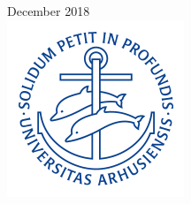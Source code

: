 \begin{titlepage}


{\large December 2018}\\[1cm] %


\includegraphics{Setup/Graphics-setup/AU_LOGO.png}\\[1cm] %

\vfill
\end{titlepage}